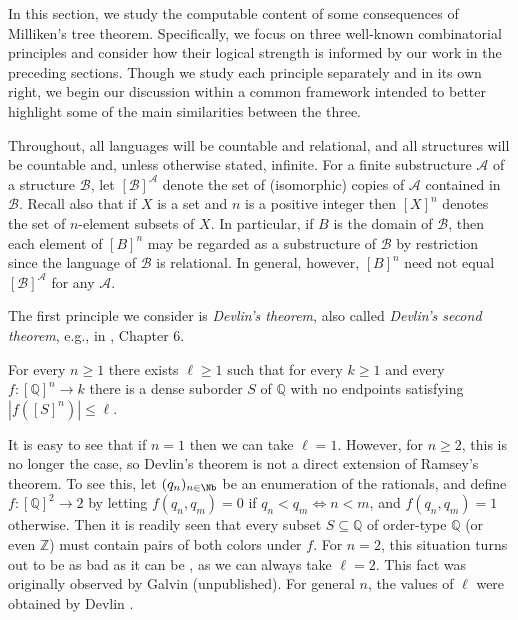 In this section, we study the computable content of some consequences of Milliken's tree theorem. Specifically, we focus on three well-known combinatorial principles and consider how their logical strength is informed by our work in the preceding sections. Though we study each principle separately and in its own right, we begin our discussion within a common framework intended to better highlight some of the main similarities between the three.

Throughout, all languages will be countable and relational, and all structures will be countable and, unless otherwise stated, infinite. For a finite substructure $\mathcal{A}$ of a structure $\mathcal{B}$, let $[\mathcal{B}]^\mathcal{A}$ denote the set of (isomorphic) copies of $\mathcal{A}$ contained in $\mathcal{B}$. Recall also that if $X$ is a set and $n$ is a positive integer then $[X]^n$ denotes the set of $n$-element subsets of $X$. In particular, if $B$ is the domain of $\mathcal{B}$, then each element of $[B]^n$ may be regarded as a substructure of $\mathcal{B}$ by restriction since the language of $\mathcal{B}$ is relational. In general, however, $[B]^n$ need not equal $[\mathcal{B}]^\mathcal{A}$ for any $\mathcal{A}$.

The first principle we consider is \emph{Devlin's theorem}, also called \emph{Devlin's second theorem}, e.g., in \cite{Todorcevic2010Ramsey}, Chapter 6.
\begin{theorem}
	For every $n \geq 1$ there exists $\ell \geq 1$ such that for every $k \geq 1$ and every $f : [\mathbb{Q}]^n \to k$ there is a dense suborder $S$ of $\mathbb{Q}$ with no endpoints satisfying $|f ([S]^n)| \leq \ell$.
\end{theorem}
\noindent It is easy to see that if $n = 1$ then we can take $\ell = 1$. However, for $n \geq 2$, this is no longer the case, so Devlin's theorem is not a direct extension of Ramsey's theorem. To see this, let $(q_n)_{n\in\Nb}$ be an enumeration of the rationals, and define $f : [\mathbb Q]^2\to 2$ by letting $f(q_n, q_m) = 0$ if $q_n<q_m\iff n<m$, and $f(q_n, q_m) = 1$ otherwise. Then it is readily seen that every subset $S\subseteq\mathbb Q$ of order-type $\mathbb Q$ (or even $\mathbb Z$) must contain pairs of both colors under $f$. For $n = 2$, this situation turns out to be as bad as it can be , as we can always take $\ell = 2$. This fact was originally observed by Galvin (unpublished). For general $n$, the values of $\ell$ were obtained by Devlin \cite[Chapter 4]{Devlin1980}.

